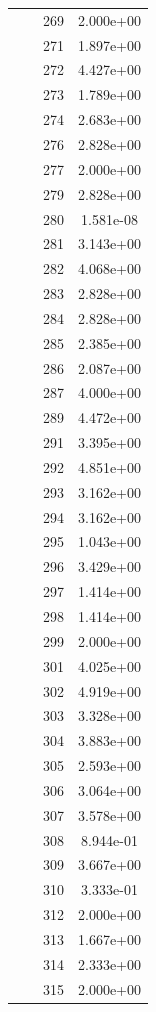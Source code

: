 \documentclass[12pt]{article}
\begin{document}
\begin{longtable}{@{}cccc@{}}
 &  & 269 & 2.000e+00 \\
 &  & 271 & 1.897e+00 \\
 &  & 272 & 4.427e+00 \\
 &  & 273 & 1.789e+00 \\
 &  & 274 & 2.683e+00 \\
 &  & 276 & 2.828e+00 \\
 &  & 277 & 2.000e+00 \\
 &  & 279 & 2.828e+00 \\
 &  & 280 & 1.581e-08 \\
 &  & 281 & 3.143e+00 \\
 &  & 282 & 4.068e+00 \\
 &  & 283 & 2.828e+00 \\
 &  & 284 & 2.828e+00 \\
 &  & 285 & 2.385e+00 \\
 &  & 286 & 2.087e+00 \\
 &  & 287 & 4.000e+00 \\
 &  & 289 & 4.472e+00 \\
 &  & 291 & 3.395e+00 \\
 &  & 292 & 4.851e+00 \\
 &  & 293 & 3.162e+00 \\
 &  & 294 & 3.162e+00 \\
 &  & 295 & 1.043e+00 \\
 &  & 296 & 3.429e+00 \\
 &  & 297 & 1.414e+00 \\
 &  & 298 & 1.414e+00 \\
 &  & 299 & 2.000e+00 \\
 &  & 301 & 4.025e+00 \\
 &  & 302 & 4.919e+00 \\
 &  & 303 & 3.328e+00 \\
 &  & 304 & 3.883e+00 \\
 &  & 305 & 2.593e+00 \\
 &  & 306 & 3.064e+00 \\
 &  & 307 & 3.578e+00 \\
 &  & 308 & 8.944e-01 \\
 &  & 309 & 3.667e+00 \\
 &  & 310 & 3.333e-01 \\
 &  & 312 & 2.000e+00 \\
 &  & 313 & 1.667e+00 \\
 &  & 314 & 2.333e+00 \\
 &  & 315 & 2.000e+00 \\

\end{longtable}
\end{document}
